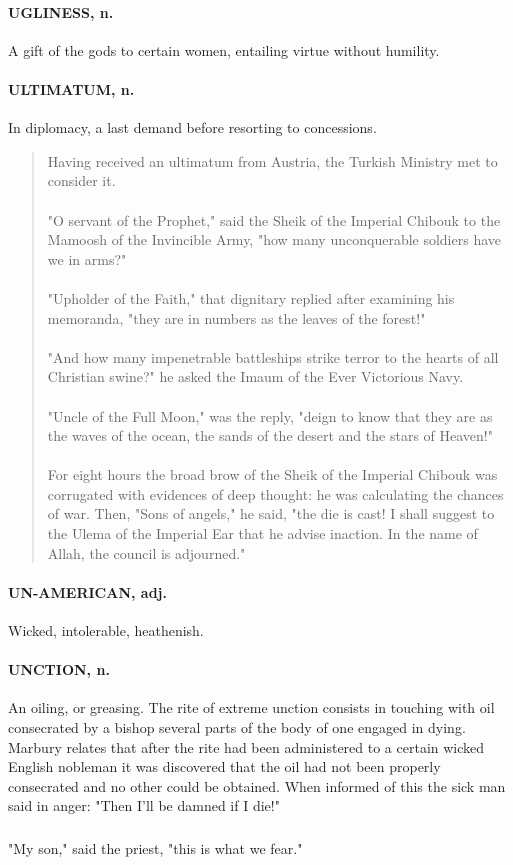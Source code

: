 \documentclass[11pt]{article}
\begin{document}
\paragraph{UGLINESS, n.}  A gift of the gods to certain women, entailing virtue
without humility.

\paragraph{ULTIMATUM, n.}  In diplomacy, a last demand before resorting to
concessions.

\begin{quote}   Having received an ultimatum from Austria, the Turkish Ministry 
met to consider it. \\
  \\
   "O servant of the Prophet," said the Sheik of the Imperial Chibouk 
to the Mamoosh of the Invincible Army, "how many unconquerable 
soldiers have we in arms?" \\
  \\
   "Upholder of the Faith," that dignitary replied after examining 
his memoranda, "they are in numbers as the leaves of the forest!" \\
  \\
   "And how many impenetrable battleships strike terror to the hearts 
of all Christian swine?" he asked the Imaum of the Ever Victorious 
Navy. \\
  \\
   "Uncle of the Full Moon," was the reply, "deign to know that they 
are as the waves of the ocean, the sands of the desert and the stars 
of Heaven!" \\
  \\
   For eight hours the broad brow of the Sheik of the Imperial 
Chibouk was corrugated with evidences of deep thought:  he was 
calculating the chances of war.  Then, "Sons of angels," he said, "the
die is cast!  I shall suggest to the Ulema of the Imperial Ear that he
advise inaction.  In the name of Allah, the council is adjourned."
\end{quote}

\paragraph{UN-AMERICAN, adj.}  Wicked, intolerable, heathenish.

\paragraph{UNCTION, n.}  An oiling, or greasing.  The rite of extreme unction
consists in touching with oil consecrated by a bishop several parts of
the body of one engaged in dying.  Marbury relates that after the rite
had been administered to a certain wicked English nobleman it was
discovered that the oil had not been properly consecrated and no other
could be obtained.  When informed of this the sick man said in anger:
"Then I'll be damned if I die!"
\subparagraph{}   "My son," said the priest, "this is what we fear."
\end{document}
